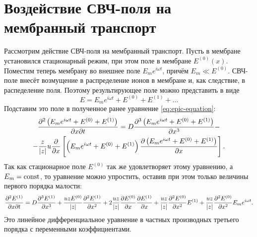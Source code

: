 \section{Воздействие СВЧ-поля на мембранный транспорт}

Рассмотрим действие СВЧ-поля на мембранный транспорт. Пусть в мембране
установился стационарный режим, при этом поле в мембране \( E^{(0)}(x) \).
Поместим теперь мембрану во внешнее поле \( E_m e^{i\omega t} \), причём
\( E_m \ll E^{(0)} \). СВЧ-поле внесёт возмущение в распределение ионов в мембране и, как следствие, в распеделение поля. Поэтому результирующее поле можно представить в виде
\begin{equation}
    E = E_m e^{i\omega t} + E^{(0)} + E^{(1)} + \ldots
\end{equation}
Подставим это поле в полученное ранее уравнение \eqref{eq:epic-equation}:
\begin{gather*}
    \frac{\partial^2 \left(E_m e^{i\omega t} + E^{(0)} + E^{(1)}\right)}{\partial x \partial t} =
     D\frac{\partial^3
         \left(E_m e^{i\omega t} + E^{(0)} + E^{(1)}\right)
    }{\partial x^3}
     -\\-
    \frac{z}{\left| z \right|}u\frac{\partial }{\partial x}\left[
    \left(E_m e^{i\omega t} + E^{(0)} + E^{(1)}\right)
    \frac{\partial \left(E_m e^{i\omega t} + E^{(0)} + E^{(1)}\right)}{\partial x}\right].
\end{gather*}
Так как стационарное поле \( E^{(0)} \) так же удовлетворяет этому уравнению,
а \( E_m = \mathrm{const} \), то уравнение можно упростить, оставив при этом только
величины первого порядка малости:
\begin{equation}
    \frac{\partial^2 E^{(1)}}{\partial x \partial t} = D\frac{\partial^3 E^{(1)}}{\partial x^3} +
    \frac{uzE^{(0)}}{\left| z \right|}\frac{\partial^2 E^{(1)}}{\partial {x}^2} +
    2\frac{uz}{\left| z \right|}\frac{\partial E^{(0)}}{\partial x}\frac{\partial E^{(1)}}{\partial x} +
    \frac{uz}{\left| z \right|}\frac{\partial^2 E^{(0)}}{\partial {x}^2} E^{(1)} +
    \frac{uz}{\left| z \right|}\frac{\partial^2 E^{(0)}}{\partial {x}^2} E_m e^{i\omega t}.
\end{equation}
Это линейное дифференциальное уравнение в частных производных третьего порядка с
переменными коэффициентами.
